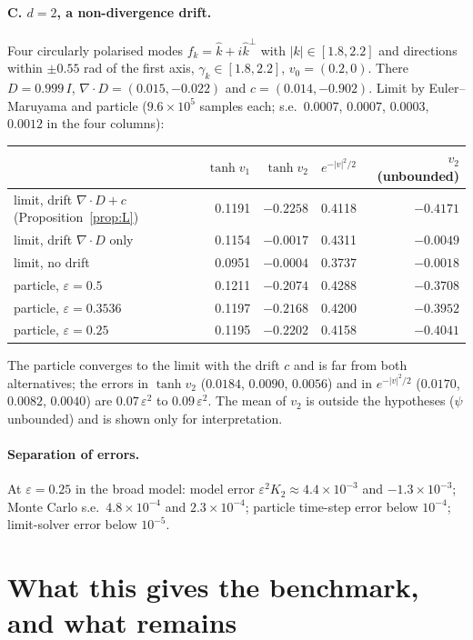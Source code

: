 \documentclass[11pt]{article}
\newcommand{\eps}{\varepsilon}
\theoremstyle{remark}
\begin{document}
\paragraph{C. $d=2$, a non-divergence drift.} Four circularly polarised
modes $f_k=\hat k+i\hat k^\perp$ with $|k|\in[1.8,2.2]$ and directions
within $\pm0.55$ rad of the first axis, $\gamma_k\in[1.8,2.2]$,
$v_0=(0.2,0)$. There $D=0.999\,I$, $\nabla\cdot D=(0.015,-0.022)$ and
$c=(0.014,-0.902)$. Limit by Euler--Maruyama and particle
($9.6\times10^5$ samples each; s.e.\ $0.0007$, $0.0007$, $0.0003$,
$0.0012$ in the four columns):
\begin{center}
\begin{tabular}{lrrrr}
  & $\tanh v_1$ & $\tanh v_2$ & $e^{-|v|^2/2}$ & $v_2$ (unbounded) \\ \hline
  limit, drift $\nabla\cdot D+c$ (Proposition~\ref{prop:L}) & 0.1191 & $-0.2258$ & 0.4118 & $-0.4171$ \\
  limit, drift $\nabla\cdot D$ only & 0.1154 & $-0.0017$ & 0.4311 & $-0.0049$ \\
  limit, no drift & 0.0951 & $-0.0004$ & 0.3737 & $-0.0018$ \\ \hline
  particle, $\eps=0.5$ & 0.1211 & $-0.2074$ & 0.4288 & $-0.3708$ \\
  particle, $\eps=0.3536$ & 0.1197 & $-0.2168$ & 0.4200 & $-0.3952$ \\
  particle, $\eps=0.25$ & 0.1195 & $-0.2202$ & 0.4158 & $-0.4041$ \\
\end{tabular}
\end{center}
The particle converges to the limit with the drift $c$ and is far from
both alternatives; the errors in $\tanh v_2$ ($0.0184$, $0.0090$, $0.0056$)
and in $e^{-|v|^2/2}$ ($0.0170$, $0.0082$, $0.0040$) are $0.07\,\eps^2$ to
$0.09\,\eps^2$. The mean of $v_2$ is outside the hypotheses ($\psi$
unbounded) and is shown only for interpretation.

\paragraph{Separation of errors.} At $\eps=0.25$ in the broad model: model
error $\eps^2K_2\approx4.4\times10^{-3}$ and $-1.3\times10^{-3}$; Monte
Carlo s.e.\ $4.8\times10^{-4}$ and $2.3\times10^{-4}$; particle time-step
error below $10^{-4}$; limit-solver error below $10^{-5}$.

\section{What this gives the benchmark, and what remains}
\end{document}
